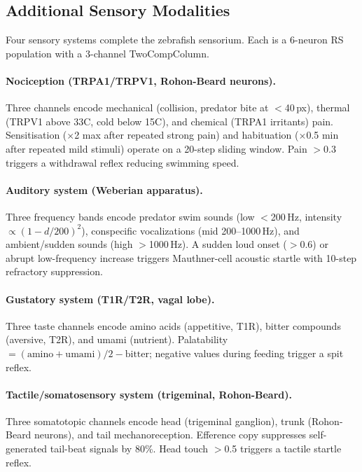 \documentclass[11pt,a4paper]{article}
\begin{document}
\subsection{Additional Sensory Modalities}

Four sensory systems complete the zebrafish sensorium.
Each is a 6-neuron RS population with a 3-channel TwoCompColumn.

\paragraph{Nociception (TRPA1/TRPV1, Rohon-Beard neurons).}
Three channels encode mechanical (collision, predator bite at $<$40\,px),
thermal (TRPV1 above 33\textdegree{}C, cold below 15\textdegree{}C), and
chemical (TRPA1 irritants) pain.
Sensitisation ($\times$2 max after repeated strong pain) and habituation
($\times$0.5 min after repeated mild stimuli) operate on a 20-step
sliding window.
Pain $>$0.3 triggers a withdrawal reflex reducing swimming speed.

\paragraph{Auditory system (Weberian apparatus).}
Three frequency bands encode predator swim sounds (low $<$200\,Hz,
intensity $\propto (1-d/200)^2$), conspecific vocalizations (mid
200--1000\,Hz), and ambient/sudden sounds (high $>$1000\,Hz).
A sudden loud onset ($>$0.6) or abrupt low-frequency increase triggers
Mauthner-cell acoustic startle with 10-step refractory suppression.

\paragraph{Gustatory system (T1R/T2R, vagal lobe).}
Three taste channels encode amino acids (appetitive, T1R), bitter
compounds (aversive, T2R), and umami (nutrient).
Palatability $= (\text{amino}+\text{umami})/2 - \text{bitter}$; negative
values during feeding trigger a spit reflex.

\paragraph{Tactile/somatosensory system (trigeminal, Rohon-Beard).}
Three somatotopic channels encode head (trigeminal ganglion), trunk
(Rohon-Beard neurons), and tail mechanoreception.
Efference copy suppresses self-generated tail-beat signals by 80\%.
Head touch $>$0.5 triggers a tactile startle reflex.
\end{document}
